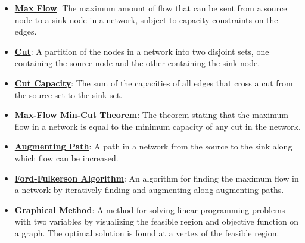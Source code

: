 \documentclass{article}%
\begin{document}
\begin{itemize}[leftmargin=*]%
\item \href{https://www.math.purdue.edu/~yipn/421/2024-11-19-MaxFlowMinCut.pdf#page=1}{\textbf{Max Flow}}: The maximum amount of flow that can be sent from a source node to a sink node in a network, subject to capacity constraints on the edges.%
\item \href{https://www.math.purdue.edu/~yipn/421/2024-11-19-MaxFlowMinCut.pdf#page=2}{\textbf{Cut}}: A partition of the nodes in a network into two disjoint sets, one containing the source node and the other containing the sink node.%
\item \href{https://www.math.purdue.edu/~yipn/421/2024-11-19-MaxFlowMinCut.pdf#page=2}{\textbf{Cut Capacity}}: The sum of the capacities of all edges that cross a cut from the source set to the sink set.%
\item \href{https://www.math.purdue.edu/~yipn/421/2024-11-19-MaxFlowMinCut.pdf#page=4}{\textbf{Max{-}Flow Min{-}Cut Theorem}}: The theorem stating that the maximum flow in a network is equal to the minimum capacity of any cut in the network.%
\item \href{https://www.math.purdue.edu/~yipn/421/2024-11-19-MaxFlowMinCut.pdf#page=10}{\textbf{Augmenting Path}}: A path in a network from the source to the sink along which flow can be increased.%
\item \href{https://www.math.purdue.edu/~yipn/421/2024-11-19-MaxFlowMinCut.pdf#page=10}{\textbf{Ford{-}Fulkerson Algorithm}}: An algorithm for finding the maximum flow in a network by iteratively finding and augmenting along augmenting paths.%
\end{itemize}%
\begin{itemize}[leftmargin=*]%
\item \href{https://www.math.purdue.edu/~yipn/421/2024-12-03-Duality.pdf#page=3}{\textbf{Graphical Method}}: A method for solving linear programming problems with two variables by visualizing the feasible region and objective function on a graph. The optimal solution is found at a vertex of the feasible region.%
\end{itemize}

%
\end{document}
